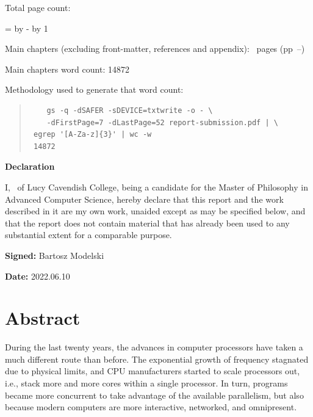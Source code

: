 \documentclass[12pt,a4paper,twoside]{report}
\newif\ifsubmission %
\newcommand{\college}{Lucy Cavendish College}
\newcommand{\course}{Master of Philosophy in Advanced Computer Science}
\begin{document}
\begin{sffamily}
Total page count: \pageref{lastpage}

\makeatletter
\@tempcnta=\relax%
\advance\@tempcnta by -%
\advance\@tempcnta by 1%
\xdef\contentpages{\the\@tempcnta}%
\makeatother

Main chapters (excluding front-matter, references and appendix):
\contentpages~pages
(pp~\pageref{firstcontentpage}--\pageref{lastcontentpage})

Main chapters word count: 14872

Methodology used to generate that word count: 

\begin{quote}
\begin{verbatim}
    gs -q -dSAFER -sDEVICE=txtwrite -o - \
    -dFirstPage=7 -dLastPage=52 report-submission.pdf | \
 egrep '[A-Za-z]{3}' | wc -w
 14872 
\end{verbatim}
\end{quote}

\end{sffamily}

\vspace{\fill}
\onehalfspacing
\ifsubmission\else\makeatletter
\textbf{\Huge Declaration}
\vspace{40pt}

I, \@author\ of \college, being a candidate for the \course, hereby
declare that this report and the work described in it are my own work,
unaided except as may be specified below, and that the report does not
contain material that has already been used to any substantial extent
for a comparable purpose.


\bigskip 
\textbf{Signed:} Bartosz Modelski

\bigskip
\textbf{Date:} 2022.06.10
\vspace{\fill}
\makeatother\fi


\chapter*{Abstract}

During the last twenty years, the advances in computer processors have taken a much different route than before. The exponential growth of frequency stagnated due to physical limits, and CPU manufacturers started to scale processors out, i.e., stack more and more cores within a single processor. In turn, programs became more concurrent to take advantage of the available parallelism, but also because modern computers are more interactive, networked, and omnipresent. 
\end{document}
